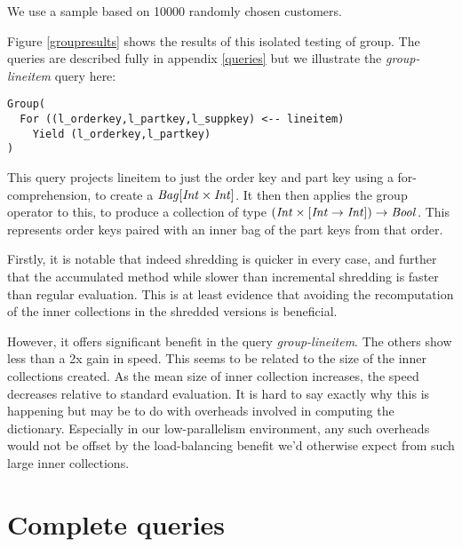We use a sample based on 10000 randomly chosen customers.

Figure \ref{groupresults} shows the results of this isolated testing of group. The queries are described fully in appendix \ref{queries} but we illustrate the \textit{group-lineitem} query here:
\vs\begin{lstlisting}
Group(
  For ((l_orderkey,l_partkey,l_suppkey) <-- lineitem)
    Yield (l_orderkey,l_partkey)
)
\end{lstlisting}\vs

This query projects lineitem to just the order key and part key using a for-comprehension, to create a $\textrm{\textit{Bag}}[\textrm{\textit{Int}} \times \textrm{\textit{Int}}]$. It then then applies the group operator to this, to produce a collection of type $(\textrm{\textit{Int}} \times [\textrm{\textit{Int}} \rightarrow \textrm{\textit{Int}}]) \rightarrow \textrm{\textit{Bool}}$. This represents order keys paired with an inner bag of the part keys from that order.

Firstly, it is notable that indeed shredding is quicker in every case, and further that the accumulated method while slower than incremental shredding is faster than regular evaluation. This is at least evidence that avoiding the recomputation of the inner collections in the shredded versions is beneficial.

However, it offers significant benefit in the query \textit{group-lineitem}. The others show less than a 2x gain in speed. This seems to be related to the size of the inner collections created. As the mean size of inner collection increases, the speed decreases relative to standard evaluation. It is hard to say exactly why this is happening but may be to do with overheads involved in computing the dictionary. Especially in our low-parallelism environment, any such overheads would not be offset by the load-balancing benefit we'd otherwise expect from such large inner collections.

\section{Complete queries}


